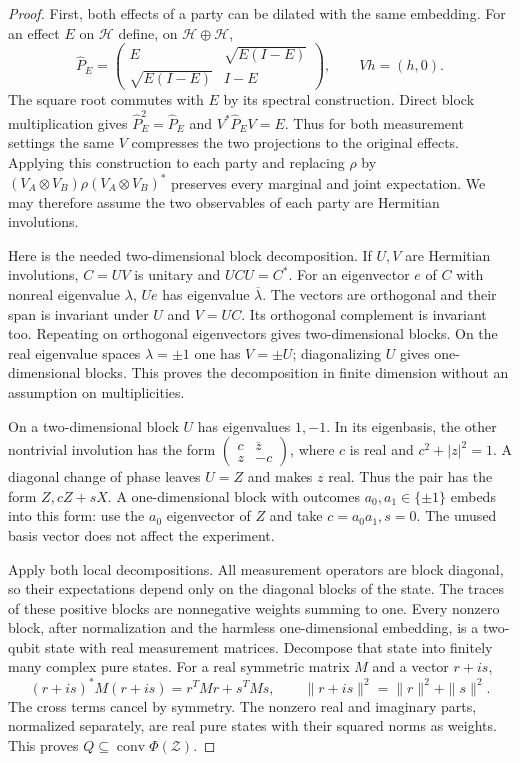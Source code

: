 \begin{proof}
First, both effects of a party can be dilated with the same embedding.
For an effect $E$ on $\mathcal H$ define, on $\mathcal H\oplus\mathcal H$,
\[
 \widehat P_E=
 \begin{pmatrix}E&\sqrt{E(I-E)}\\
                 \sqrt{E(I-E)}&I-E\end{pmatrix},
 \qquad Vh=(h,0).
 \tag{RFA4}
\]
The square root commutes with $E$ by its spectral construction. Direct
block multiplication gives $\widehat P_E^2=\widehat P_E$ and
$V^*\widehat P_EV=E$. Thus for both measurement settings the same $V$
compresses the two projections to the original effects. Applying this
construction to each party and replacing $\rho$ by
$(V_A\otimes V_B)\rho(V_A\otimes V_B)^*$ preserves every marginal and
joint expectation. We may therefore assume the two observables of each
party are Hermitian involutions.

Here is the needed two-dimensional block decomposition. If $U,V$ are
Hermitian involutions, $C=UV$ is unitary and $UCU=C^*$. For an eigenvector
$e$ of $C$ with nonreal eigenvalue $\lambda$, $Ue$ has eigenvalue
$\overline\lambda$. The vectors are orthogonal and their span is invariant
under $U$ and $V=UC$. Its orthogonal complement is invariant too. Repeating
on orthogonal eigenvectors gives two-dimensional blocks. On the real
eigenvalue spaces $\lambda=\pm1$ one has $V=\pm U$; diagonalizing $U$ gives
one-dimensional blocks. This proves the decomposition in finite dimension
without an assumption on multiplicities.

On a two-dimensional block $U$ has eigenvalues $1,-1$. In its eigenbasis,
the other nontrivial involution has the form
$\left(\begin{smallmatrix}c&\overline z\\z&-c\end{smallmatrix}\right)$,
where $c$ is real and $c^2+|z|^2=1$. A diagonal change of phase leaves
$U=Z$ and makes $z$ real. Thus the pair has the form $Z,cZ+sX$.
A one-dimensional block with outcomes $a_0,a_1\in\{\pm1\}$ embeds into
this form: use the $a_0$ eigenvector of $Z$ and take
$c=a_0a_1,s=0$. The unused basis vector does not affect the experiment.

Apply both local decompositions. All measurement operators are block
diagonal, so their expectations depend only on the diagonal blocks of
the state. The traces of these positive blocks are nonnegative weights
summing to one. Every nonzero block, after normalization and the harmless
one-dimensional embedding, is a two-qubit state with real measurement
matrices. Decompose that state into finitely many complex pure states.
For a real symmetric matrix $M$ and a vector $r+is$,
\[
 (r+is)^*M(r+is)=r^TMr+s^TMs,\qquad
 \|r+is\|^2=\|r\|^2+\|s\|^2.
 \tag{RFA5}
\]
The cross terms cancel by symmetry. The nonzero real and imaginary parts,
normalized separately, are real pure states with their squared norms as
weights. This proves $Q\subseteq\operatorname{conv}\Phi(\mathcal Z)$.


\end{proof}
